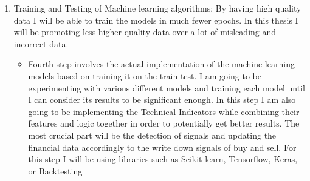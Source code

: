 \documentclass{imc-inf}
\begin{document}
\begin{enumerate}
\begin{enumerate}
			
		\end{enumerate}
		
		
		
		\item Training and Testing of Machine learning algorithms: By having high quality
		data I will be able to train the models in much fewer epochs. In this thesis I will
		be promoting less higher quality data over a lot of misleading and incorrect data. 
		\begin{itemize}
			\item Fourth step involves the actual implementation of the machine learning models based
			on training it on the train test. I am going to be experimenting with various different 
			models and training each model until I can consider its results to be
			significant enough. In this step I am also going to be implementing the Technical Indicators while combining their 
			features and logic together in order to potentially get better results.
			The most crucial part will be the detection of signals and updating the financial data
			accordingly to the write down signals of buy and sell. For this step I will be using libraries such as 
			Scikit-learn, Tensorflow, Keras, or Backtesting
			

\end{itemize}
\end{enumerate}
\end{document}
